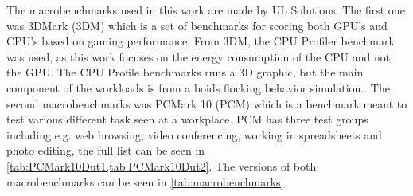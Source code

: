 The macrobenchmarks used in this work are made by UL Solutions. The first one was 3DMark (3DM) which is a set of benchmarks for scoring both GPU's and CPU's based on gaming performance. From 3DM, the CPU Profiler benchmark was used, as this work focuses on the energy consumption of the CPU and not the GPU. The CPU Profile benchmarks runs a 3D graphic, but the main component of the workloads is from a boids flocking behavior simulation.\cite{3dmark}. The second macrobenchmarks was PCMark 10 (PCM) which is a benchmark meant to test various different task seen at a workplace. PCM has three test groups including e.g. web browsing, video conferencing, working in spreadsheets and photo editing, the full list can be seen in \cref{tab:PCMark10Dut1,tab:PCMark10Dut2}.\cite{pcmark} The versions of both macrobenchmarks can be seen in \cref{tab:macrobenchmarks}.
